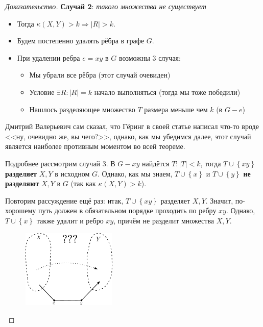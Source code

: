 \begin{proof}[Доказательство]
    \textbf{Случай 2}: \textit{такого множества не существует}

    \begin{itemize}
        \item Тогда $\kappa(X,Y) > k \Rightarrow |R| > k$.
        \item Будем постепенно удалять рёбра в графе $G$.
        \item При удалении ребра $e = xy$ в $G$ возможны 3 случая:
            \begin{itemize}
                \item Мы убрали все рёбра (этот случай очевиден)
                \item Условие $\exists R: |R| = k$ начало выполняться (тогда мы тоже победили)
                \item Нашлось разделяющее множество $T$ размера меньше чем $k$ (в $G-e$)
            \end{itemize}
    \end{itemize}
    \begin{note}
        Дмитрий Валерьевич сам сказал, что Гёринг в своей статье написал что-то вроде <<ну, очевидно же, вы чего?>>, однако, как мы убедимся далее, этот случай является наиболее противным моментом во всей теореме.
    \end{note}

    Подробнее рассмотрим случай 3. В $G - xy$ найдётся $T: |T| < k$, тогда $T \cup \left\{ xy \right \}$ \textbf{разделяет} $X, Y$ в исходном $G$. Однако, как мы знаем, $T \cup \left\{ x \right \}$ и $T \cup \left\{ y \right \}$ \textbf{не разделяют} $X, Y$ в $G$ (так как $\kappa(X,Y) > k$).

    Повторим рассуждение ещё раз: итак, $T \cup \left\{ xy \right \} $ разделяет $X,Y$. Значит, по-хорошему путь должен в обязательном порядке проходить по ребру $xy$. Однако, $T \cup \left\{ x \right \} $ также удалит и ребро $xy$, причём не разделит множества $X,Y$.
    \begin{figure}[h]
        \centering
        \includegraphics[width=0.4\textwidth]{images/menger-badcase}
    \end{figure}


\end{proof}

